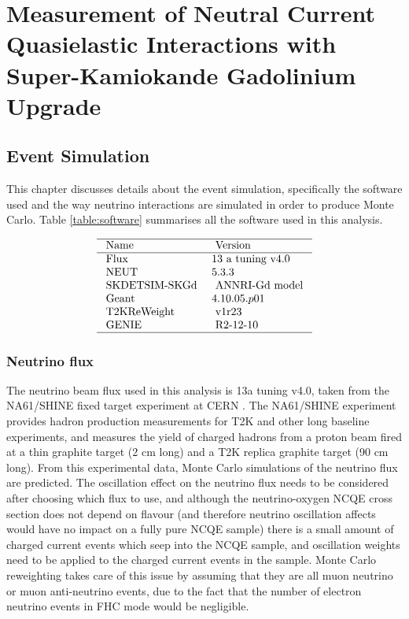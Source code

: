 \chapter{Measurement of Neutral Current Quasielastic
Interactions with Super-Kamiokande Gadolinium Upgrade}
\label{chp:ncqegd}

\section{Event Simulation}

This chapter discusses details about the event simulation, specifically the software used and the way neutrino interactions are simulated in order to produce Monte Carlo. Table \ref{table:software} summarises all the software used in this analysis. 


\begin{table}
$$
\begin{array}{ll}
\hline \text { Name } & \text { Version } \\
\hline \text { Flux } & 13 \text { a tuning v4.0 } \\
\text { NEUT } & 5.3 .3 \\
\text { SKDETSIM-SKGd } & \text { ANNRI-Gd model } \\
\text { Geant } & 4.10.05.p01 \\
\text { T2KReWeight } & \text { v1r23 } \\
\text { GENIE } & \text { R2-12-10 } \\
\hline
\end{array}
$$
\end{table}

\subsection{Neutrino flux}

The neutrino beam flux used in this analysis is 13a tuning v4.0, taken from the NA61/SHINE fixed target experiment at CERN \cite{vladisavljevic_constraining_2018}.  The NA61/SHINE experiment provides hadron production measurements for T2K and other long baseline experiments, and measures the yield of charged hadrons from a proton beam fired at a thin graphite target (2 cm long) and a T2K replica graphite target (90 cm long). From this experimental data, Monte Carlo simulations of the neutrino flux are predicted. The oscillation effect on the neutrino flux needs to be considered after choosing which flux to use, and although the neutrino-oxygen NCQE cross section does not depend on flavour (and therefore neutrino oscillation affects would have no impact on a fully pure NCQE sample) there is a small amount of charged current events which seep into the NCQE sample, and oscillation weights need to be applied to the charged current events in the sample. Monte Carlo reweighting takes care of this issue by assuming that they are all muon neutrino or muon anti-neutrino events, due to the fact that the number of electron neutrino events in FHC mode would be negligible.

